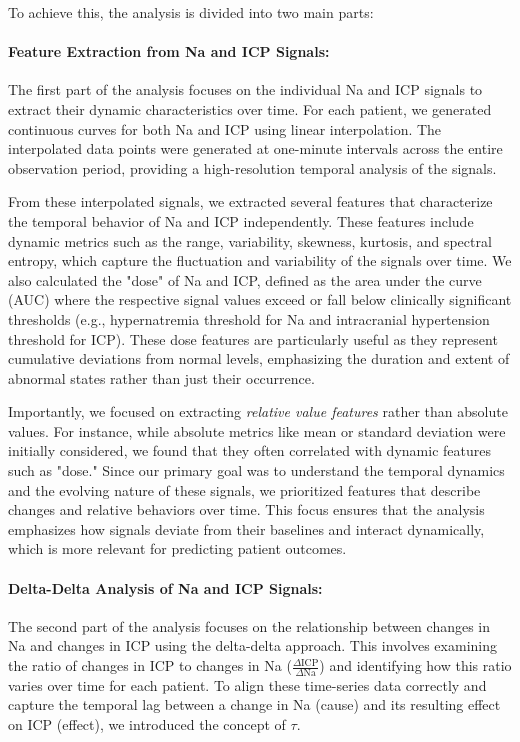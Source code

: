 To achieve this, the analysis is divided into two main parts:

\paragraph{Feature Extraction from Na and ICP Signals:}

The first part of the analysis focuses on the individual Na and ICP signals to extract their dynamic characteristics over time. For each patient, we generated continuous curves for both Na and ICP using linear interpolation. The interpolated data points were generated at one-minute intervals across the entire observation period, providing a high-resolution temporal analysis of the signals.

From these interpolated signals, we extracted several features that characterize the temporal behavior of Na and ICP independently. These features include dynamic metrics such as the range, variability, skewness, kurtosis, and spectral entropy, which capture the fluctuation and variability of the signals over time. We also calculated the "dose" of Na and ICP, defined as the area under the curve (AUC) where the respective signal values exceed or fall below clinically significant thresholds (e.g., hypernatremia threshold for Na and intracranial hypertension threshold for ICP). These dose features are particularly useful as they represent cumulative deviations from normal levels, emphasizing the duration and extent of abnormal states rather than just their occurrence.

Importantly, we focused on extracting \textit{relative value features} rather than absolute values. For instance, while absolute metrics like mean or standard deviation were initially considered, we found that they often correlated with dynamic features such as "dose." Since our primary goal was to understand the temporal dynamics and the evolving nature of these signals, we prioritized features that describe changes and relative behaviors over time. This focus ensures that the analysis emphasizes how signals deviate from their baselines and interact dynamically, which is more relevant for predicting patient outcomes.

\paragraph{Delta-Delta Analysis of Na and ICP Signals:}

The second part of the analysis focuses on the relationship between changes in Na and changes in ICP using the delta-delta approach. This involves examining the ratio of changes in ICP to changes in Na ($\frac{\Delta \text{ICP}}{\Delta \text{Na}}$) and identifying how this ratio varies over time for each patient. To align these time-series data correctly and capture the temporal lag between a change in Na (cause) and its resulting effect on ICP (effect), we introduced the concept of $\tau$.

